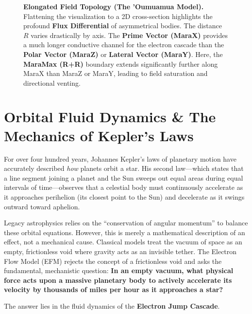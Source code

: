 \documentclass[11pt, a4paper]{article}
\begin{document}
\begin{figure}[!ht]
{\begin{tikzpicture}[scale=1.25, >=Stealth]
    \end{tikzpicture}
  }
  \caption{\textbf{Elongated Field Topology (The 'Oumuamua Model).} Flattening the visualization to a 2D cross-section highlights the profound \textbf{Flux Differential} of asymmetrical bodies. The distance $R$ varies drastically by axis. The \textbf{Prime Vector (MaraX)} provides a much longer conductive channel for the electron cascade than the \textbf{Polar Vector (MaraZ)} or \textbf{Lateral Vector (MaraY)}. Here, the \textbf{MaraMax (R+R)} boundary extends significantly further along MaraX than MaraZ or MaraY, leading to field saturation and directional venting.}
  \label{fig:elongated_2d}
\end{figure}

\clearpage
\section{Orbital Fluid Dynamics \& The Mechanics of Kepler's Laws}

For over four hundred years, Johannes Kepler's laws of planetary motion have accurately described \textit{how} planets orbit a star. His second law—which states that a line segment joining a planet and the Sun sweeps out equal areas during equal intervals of time—observes that a celestial body must continuously accelerate as it approaches perihelion (its closest point to the Sun) and decelerate as it swings outward toward aphelion. 

Legacy astrophysics relies on the ``conservation of angular momentum'' to balance these orbital equations. However, this is merely a mathematical description of an effect, not a mechanical cause. Classical models treat the vacuum of space as an empty, frictionless void where gravity acts as an invisible tether. The Electron Flow Model (EFM) rejects the concept of a frictionless void and asks the fundamental, mechanistic question: \textbf{In an empty vacuum, what physical force acts upon a massive planetary body to actively accelerate its velocity by thousands of miles per hour as it approaches a star?}

The answer lies in the fluid dynamics of the \textbf{Electron Jump Cascade}. 

\end{document}
